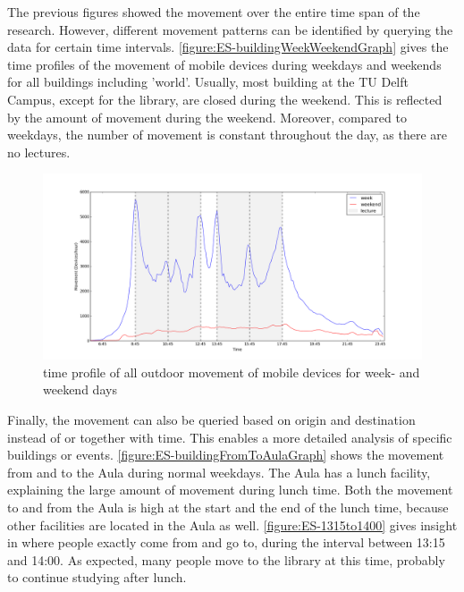 The previous figures showed the movement over the entire time span of the research. However, different movement patterns can be identified by querying the data for certain time intervals. \autoref{figure:ES-buildingWeekWeekendGraph} gives the time profiles of the movement of mobile devices during weekdays and weekends for all buildings including 'world'. Usually, most building at the TU Delft Campus, except for the library, are closed during the weekend. This is reflected by the amount of movement during the weekend. Moreover, compared to weekdays, the number of movement is constant throughout the day, as there are no lectures.

\begin{figure}[H]
\centering
\includegraphics[scale=0.2]{building_weekWeekend_graph.png}
\captionsetup{justification=centering}
\caption{time profile of all outdoor movement of mobile devices for week- and weekend days}
\label{figure:ES-buildingWeekWeekendGraph}
\end{figure}

Finally, the movement can also be queried based on origin and destination instead of or together with time. This enables a more detailed analysis of specific buildings or events. \autoref{figure:ES-buildingFromToAulaGraph} shows the movement from and to the Aula during normal weekdays. The Aula has a lunch facility, explaining the large amount of movement during lunch time. Both the movement to and from the Aula is high at the start and the end of the lunch time, because other facilities are located in the Aula as well. \autoref{figure:ES-1315to1400} gives insight in where people exactly come from and go to, during the interval between 13:15 and 14:00. As expected, many people move to the library at this time, probably to continue studying after lunch. 

